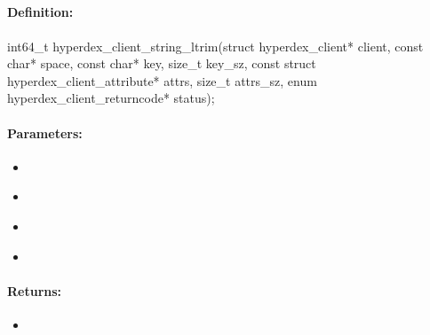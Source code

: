 \pagebreak
\subsection{}
\label{api:c:string_ltrim}


\paragraph{Definition:}
\begin{ccode}
int64_t hyperdex_client_string_ltrim(struct hyperdex_client* client,
        const char* space,
        const char* key, size_t key_sz,
        const struct hyperdex_client_attribute* attrs, size_t attrs_sz,
        enum hyperdex_client_returncode* status);
\end{ccode}

\paragraph{Parameters:}
\begin{itemize}[noitemsep]
\item {}\\

\item {}\\

\item {}\\

\item {}\\

\end{itemize}

\paragraph{Returns:}
\begin{itemize}[noitemsep]
\item {}\\

\end{itemize}

